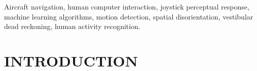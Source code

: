 \documentclass{ieeeaccess}
\begin{document}
\begin{abstract}
\end{abstract}

\begin{keywords}
Aircraft navigation, human computer interaction, joystick perceptual response, machine learning algorithms, motion detection, spatial disorientation, vestibular dead reckoning, human activity recognition.
\end{keywords}


\maketitle

\section{INTRODUCTION}
\label{INTRODUCTION}
\end{document}
